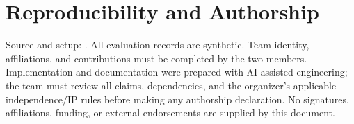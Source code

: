 \documentclass[conference,a4paper]{IEEEtran}
\begin{document}
\section*{Reproducibility and Authorship}
Source and setup: \RepoLink. All evaluation records are synthetic. Team identity, affiliations, and contributions must be completed by the two members. Implementation and documentation were prepared with AI-assisted engineering; the team must review all claims, dependencies, and the organizer's applicable independence/IP rules before making any authorship declaration. No signatures, affiliations, funding, or external endorsements are supplied by this document.

\FloatBarrier


\end{document}
